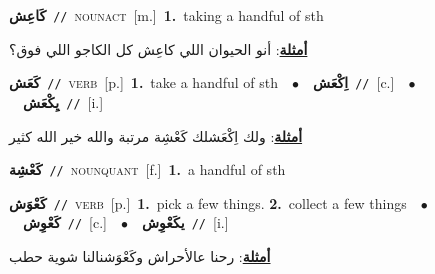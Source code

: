 \documentclass[10pt,a4paper,twoside]{article} %
\begin{document}
\begin{multicols}{2}
{\setlength\topsep{0pt}\textbf{\foreignlanguage{arabic}{كَاعِش}}\ {\color{gray}\texttt{//}\color{black}}\ \textsc{noun\textunderscore act}\ [m.]\ \textbf{1.}~taking a handful of sth\  \begin{flushright}\color{gray}\foreignlanguage{arabic}{\textbf{\underline{\foreignlanguage{arabic}{أمثلة}}}: أنو الحيوان اللي كاعِش كل الكاجو اللي فوق؟}\end{flushright}\color{black}} \vspace{2mm}

{\setlength\topsep{0pt}\textbf{\foreignlanguage{arabic}{كَعَش}}\ {\color{gray}\texttt{//}\color{black}}\ \textsc{verb}\ [p.]\ \textbf{1.}~take a handful of sth\ \ $\bullet$\ \ \setlength\topsep{0pt}\textbf{\foreignlanguage{arabic}{اِكْعَش}}\ {\color{gray}\texttt{//}\color{black}}\ [c.]\ \ $\bullet$\ \ \setlength\topsep{0pt}\textbf{\foreignlanguage{arabic}{يِكْعَش}}\ {\color{gray}\texttt{//}\color{black}}\ [i.]\  \begin{flushright}\color{gray}\foreignlanguage{arabic}{\textbf{\underline{\foreignlanguage{arabic}{أمثلة}}}: ولك اِكْعَشلك كَعْشِة مرتبة والله خير الله كثير}\end{flushright}\color{black}} \vspace{2mm}

{\setlength\topsep{0pt}\textbf{\foreignlanguage{arabic}{كَعْشِة}}\ {\color{gray}\texttt{//}\color{black}}\ \textsc{noun\textunderscore quant}\ [f.]\ \textbf{1.}~a handful of sth\ } \vspace{2mm}

{\setlength\topsep{0pt}\textbf{\foreignlanguage{arabic}{كَعْوَش}}\ {\color{gray}\texttt{//}\color{black}}\ \textsc{verb}\ [p.]\ \textbf{1.}~pick a few things.  \textbf{2.}~collect a few things\ \ $\bullet$\ \ \setlength\topsep{0pt}\textbf{\foreignlanguage{arabic}{كَعْوِش}}\ {\color{gray}\texttt{//}\color{black}}\ [c.]\ \ $\bullet$\ \ \setlength\topsep{0pt}\textbf{\foreignlanguage{arabic}{يكَعْوِش}}\ {\color{gray}\texttt{//}\color{black}}\ [i.]\  \begin{flushright}\color{gray}\foreignlanguage{arabic}{\textbf{\underline{\foreignlanguage{arabic}{أمثلة}}}: رحنا عالأحراش وكَعْوَشنالنا شوية حطب}\end{flushright}\color{black}} \vspace{2mm}


\end{multicols}
\end{document}
